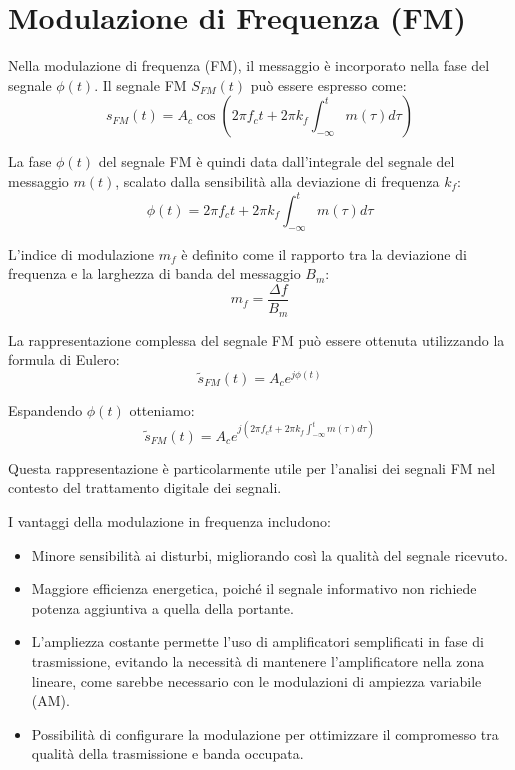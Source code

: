 \section*{Modulazione di Frequenza (FM)}

Nella modulazione di frequenza (FM), il messaggio è incorporato nella fase del segnale \( \phi(t) \). Il segnale FM \( S_{FM}(t) \) può essere espresso come:
\begin{equation}
    s_{FM}(t) = A_c \cos\left(2\pi f_c t + 2\pi k_f \int_{-\infty}^{t} m(\tau) d\tau \right)
\end{equation}

La fase \( \phi(t) \) del segnale FM è quindi data dall'integrale del segnale del messaggio \( m(t) \), scalato dalla sensibilità alla deviazione di frequenza \( k_f \):
\begin{equation}
    \phi(t) = 2\pi f_c t + 2\pi k_f \int_{-\infty}^{t} m(\tau) d\tau
\end{equation}

L'indice di modulazione \( m_f \) è definito come il rapporto tra la deviazione di frequenza e la larghezza di banda del messaggio \( B_m \):
\begin{equation}
    m_f = \frac{\Delta f}{B_m}
\end{equation}

La rappresentazione complessa del segnale FM può essere ottenuta utilizzando la formula di Eulero:
\begin{equation}
    \tilde{s}_{FM}(t) = A_c e^{j\phi(t)}
\end{equation}

Espandendo \( \phi(t) \) otteniamo:
\begin{equation}
    \tilde{s}_{FM}(t) = A_c e^{j\left(2\pi f_c t + 2\pi k_f \int_{-\infty}^{t} m(\tau) d\tau\right)}
\end{equation}

Questa rappresentazione è particolarmente utile per l'analisi dei segnali FM nel contesto del trattamento digitale dei segnali.

I vantaggi della modulazione in frequenza includono:
\begin{itemize}
    \item Minore sensibilità ai disturbi, migliorando così la qualità del segnale ricevuto.
    \item Maggiore efficienza energetica, poiché il segnale informativo non richiede potenza aggiuntiva a quella della portante.
    \item L'ampliezza costante permette l'uso di amplificatori semplificati in fase di trasmissione, evitando la necessità di mantenere l'amplificatore nella zona lineare, come sarebbe necessario con le modulazioni di ampiezza variabile (AM).
    \item Possibilità di configurare la modulazione per ottimizzare il compromesso tra qualità della trasmissione e banda occupata.
\end{itemize}

